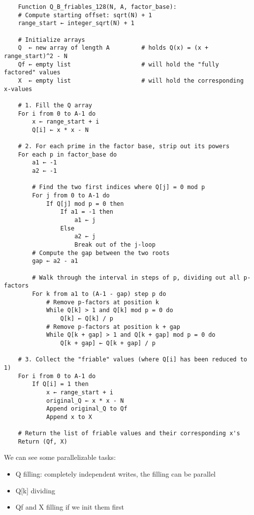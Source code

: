 \documentclass[a4paper, 11pt]{article}
\begin{document}
\begin{verbatim}
    Function Q_B_friables_128(N, A, factor_base):
    # Compute starting offset: sqrt(N) + 1
    range_start ← integer_sqrt(N) + 1

    # Initialize arrays
    Q  ← new array of length A         # holds Q(x) = (x + range_start)^2 - N
    Qf ← empty list                    # will hold the "fully factored" values
    X  ← empty list                    # will hold the corresponding x-values

    # 1. Fill the Q array
    For i from 0 to A-1 do
        x ← range_start + i
        Q[i] ← x * x - N

    # 2. For each prime in the factor base, strip out its powers
    For each p in factor_base do
        a1 ← -1
        a2 ← -1

        # Find the two first indices where Q[j] = 0 mod p
        For j from 0 to A-1 do
            If Q[j] mod p = 0 then
                If a1 = -1 then
                    a1 ← j
                Else
                    a2 ← j
                    Break out of the j-loop
        # Compute the gap between the two roots
        gap ← a2 - a1

        # Walk through the interval in steps of p, dividing out all p-factors
        For k from a1 to (A-1 - gap) step p do
            # Remove p-factors at position k
            While Q[k] > 1 and Q[k] mod p = 0 do
                Q[k] ← Q[k] / p
            # Remove p-factors at position k + gap
            While Q[k + gap] > 1 and Q[k + gap] mod p = 0 do
                Q[k + gap] ← Q[k + gap] / p

    # 3. Collect the "friable" values (where Q[i] has been reduced to 1)
    For i from 0 to A-1 do
        If Q[i] = 1 then
            x ← range_start + i
            original_Q ← x * x - N
            Append original_Q to Qf
            Append x to X

    # Return the list of friable values and their corresponding x's
    Return (Qf, X)

\end{verbatim}

We can see some parallelizable tasks:
\begin{itemize}
    \item Q filling: completely independent writes, the filling can be parallel
    \item Q[k] dividing
    \item Qf and X filling if we init them first
\end{itemize}
\end{document}
